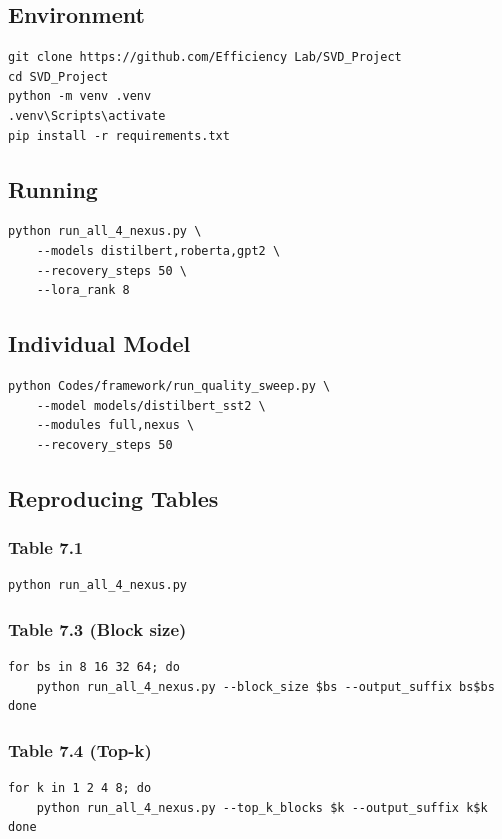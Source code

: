 \subsection{Environment}

\begin{lstlisting}
git clone https://github.com/Efficiency Lab/SVD_Project
cd SVD_Project
python -m venv .venv
.venv\Scripts\activate
pip install -r requirements.txt
\end{lstlisting}

\subsection{Running}

\begin{lstlisting}
python run_all_4_nexus.py \
    --models distilbert,roberta,gpt2 \
    --recovery_steps 50 \
    --lora_rank 8
\end{lstlisting}

\subsection{Individual Model}

\begin{lstlisting}
python Codes/framework/run_quality_sweep.py \
    --model models/distilbert_sst2 \
    --modules full,nexus \
    --recovery_steps 50
\end{lstlisting}

\subsection{Reproducing Tables}

\subsubsection{Table 7.1}
\begin{lstlisting}
python run_all_4_nexus.py
\end{lstlisting}

\subsubsection{Table 7.3 (Block size)}
\begin{lstlisting}
for bs in 8 16 32 64; do
    python run_all_4_nexus.py --block_size $bs --output_suffix bs$bs
done
\end{lstlisting}

\subsubsection{Table 7.4 (Top-k)}
\begin{lstlisting}
for k in 1 2 4 8; do
    python run_all_4_nexus.py --top_k_blocks $k --output_suffix k$k
done
\end{lstlisting}

